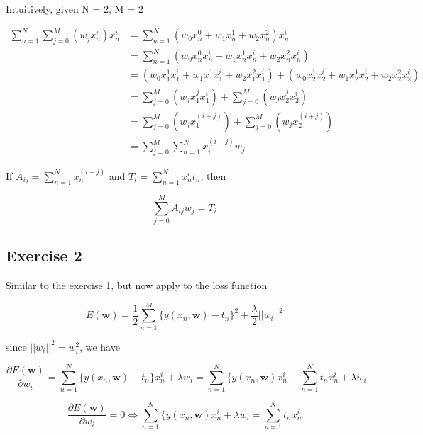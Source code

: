 Intuitively, given N = 2, M = 2

\begin{equation}
    \begin{split}
        \sum_{n=1}^N \sum_{j=0}^M (w_jx_n^i)x_n^i & = \sum_{n=1}^N (w_0x_n^0 + w_1x_n^1 + w_2x_n^2)x_n^i\\
        & = \sum_{n=1}^N (w_0x_n^0x_n^i + w_1x_n^1x_n^i + w_2x_n^2x_n^i)\\
        & = (w_0x_1^1x_1^i + w_1x_1^1x_1^i + w_2x_1^2x_1^i) + (w_0x_2^1x_2^i + w_1x_2^1x_2^i + w_2x_2^2x_2^i)\\
        & = \sum_{j=0}^M (w_jx_1^jx_1^i) + \sum_{j=0}^M (w_jx_2^jx_2^i)\\
        & = \sum_{j=0}^M (w_jx_1^{(i+j)}) + \sum_{j=0}^M (w_jx_2^{(i+j)})\\
        & = \sum_{j=0}^M \sum_{n=1}^N x_i^{(i + j)}w_j
    \end{split}    
\end{equation}


If $A_{ij} = \sum_{n=1}^N x_n^{(i + j)}$ and $T_i = \sum_{n=1}^N x_n^it_n$, then

\begin{equation}
    \sum_{j=0}^M A_{ij}w_j = T_i
\end{equation}


\subsection{Exercise 2}

Similar to the exercise 1, but now apply to the loss function

\begin{equation}
    E(\pmb{w}) = \frac{1}{2} \sum_{n=1}^M \{y(x_n, \pmb{w}) - t_n\}^2 +  \frac{\lambda}{2} ||w_i||^2
\end{equation}

since $||w_i||^2 = w_i^2 $, we have

\begin{equation}
    \frac{\partial E(\pmb{w})}{\partial w_i} = \sum_{n=1}^N \{y(x_n, \pmb{w}) - t_n\} x_n^i + \lambda w_i = \sum_{n=1}^N \{y(x_n, \pmb{w})x_n^i - \sum_{n=1}^N t_nx_n^i + \lambda w_i
\end{equation}

\begin{equation}
    \frac{\partial E(\pmb{w})}{\partial w_i} = 0 \Leftrightarrow \sum_{n=1}^N \{y(x_n, \pmb{w})x_n^i + \lambda w_i = \sum_{n=1}^N t_n x_n^i 
\end{equation}


